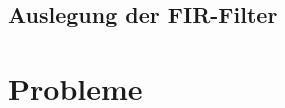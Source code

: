 \documentclass[a4paper,12pt,fleqn]{article}
\begin{document}
\subsection{Auslegung der FIR-Filter}
%
%
\section{Probleme}
\label{Problems}
%
%


\newpage


\end{document}
